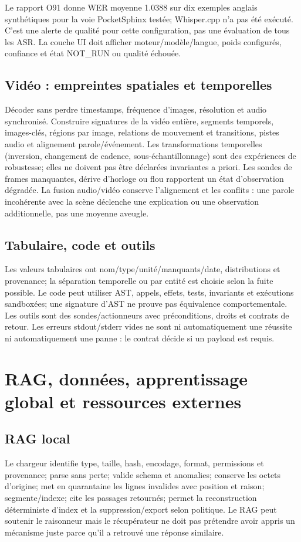 \documentclass[11pt,a4paper]{report}
\begin{document}
Le rapport O91 donne WER moyenne 1.0388 sur dix exemples anglais synthétiques pour la voie PocketSphinx testée; Whisper.cpp n'a pas été exécuté. C'est une alerte de qualité pour cette configuration, pas une évaluation de tous les ASR. La couche UI doit afficher moteur/modèle/langue, poids configurés, confiance et état NOT\_RUN ou qualité échouée.

\section{Vidéo : empreintes spatiales et temporelles}
Décoder sans perdre timestamps, fréquence d'images, résolution et audio synchronisé. Construire signatures de la vidéo entière, segments temporels, images-clés, régions par image, relations de mouvement et transitions, pistes audio et alignement parole/événement. Les transformations temporelles (inversion, changement de cadence, sous-échantillonnage) sont des expériences de robustesse; elles ne doivent pas être déclarées invariantes a priori. Les sondes de frames manquantes, dérive d'horloge ou flou rapportent un état d'observation dégradée. La fusion audio/vidéo conserve l'alignement et les conflits : une parole incohérente avec la scène déclenche une explication ou une observation additionnelle, pas une moyenne aveugle.

\section{Tabulaire, code et outils}
Les valeurs tabulaires ont nom/type/unité/manquants/date, distributions et provenance; la séparation temporelle ou par entité est choisie selon la fuite possible. Le code peut utiliser AST, appels, effets, tests, invariants et exécutions sandboxées; une signature d'AST ne prouve pas équivalence comportementale. Les outils sont des sondes/actionneurs avec préconditions, droits et contrats de retour. Les erreurs stdout/stderr vides ne sont ni automatiquement une réussite ni automatiquement une panne : le contrat décide si un payload est requis.

\chapter{RAG, données, apprentissage global et ressources externes}
\section{RAG local}
Le chargeur identifie type, taille, hash, encodage, format, permissions et provenance; parse sans perte; valide schema et anomalies; conserve les octets d'origine; met en quarantaine les lignes invalides avec position et raison; segmente/indexe; cite les passages retournés; permet la reconstruction déterministe d'index et la suppression/export selon politique. Le RAG peut soutenir le raisonneur mais le récupérateur ne doit pas prétendre avoir appris un mécanisme juste parce qu'il a retrouvé une réponse similaire.
\end{document}
